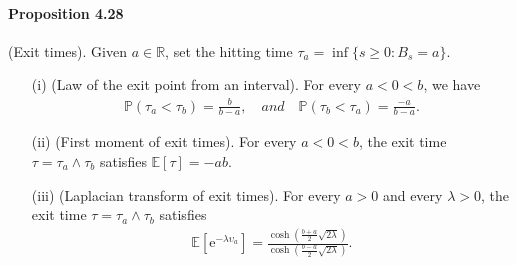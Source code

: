 \documentclass{article}
\numberwithin{equation}{section}
\newcommand{\e}{\mathrm{e}}
\newcommand{\E}{\mathbb{E}}
\renewcommand{\P}{\mathbb{P}}
\theoremstyle{plain}
\theoremstyle{definition}
\begin{document}
\paragraph{Proposition 4.28\label{prop:4.28}} (Exit times). Given $a\in\mathbb{R}$, set the hitting time $\tau_a=\inf\{s\geq 0:B_s=a\}$.
\begin{itemize}
\item[(i)] (Law of the exit point from an interval). For every $a<0<b$, we have
\begin{align*}
	\P(\tau_a<\tau_b)=\frac{b}{b-a},\quad\textit{and}\quad \P(\tau_b<\tau_a)=\frac{-a}{b-a}.
\end{align*}
\item[(ii)] (First moment of exit times). For every $a<0<b$, the exit time $\tau=\tau_a\wedge\tau_b$ satisfies $\E[\tau]=-ab$.
\item[(iii)] (Laplacian transform of exit times). For every $a>0$ and every $\lambda>0$, the exit time $\tau=\tau_a\wedge\tau_b$ satisfies
\begin{align*}
	\E\left[\e^{-\lambda\upsilon_a}\right]=\frac{\cosh\left(\frac{b+a}{2}\sqrt{2\lambda}\right)}{\cosh\left(\frac{b-a}{2}\sqrt{2\lambda}\right)}.
\end{align*}
\end{itemize}
\end{document}
